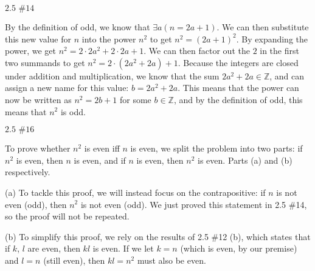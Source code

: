 \documentclass{article}
\newcommand{\problem}[2]{$\boxed{\text{#1 \##2}}$}
\newcommand{\subproblem}[1]{(#1)}
\begin{document}
\begin{multicols*}{2}
%

\problem{2.5}{14}

By the definition of odd, we know that $\exists{}a(n=2a+1)$. We can
then substitute this new value for $n$ into the power $n^2$ to get
$n^2=(2a+1)^2$. By expanding the power, we get
$n^2=2\cdot{}2a^2+2\cdot{}2a+1$. We can then factor out the $2$ in the
first two summands to get $n^2=2\cdot{}(2a^2+2a)+1$. Because the
integers are closed under addition and multiplication, we know that
the sum $2a^2+2a\in\mathbb{Z}$, and can assign a new name for this
value: $b=2a^2+2a$. This means that the power can now be written as
$n^2=2b+1$ for some $b\in\mathbb{Z}$, and by the definition of odd,
this means that $n^2$ is odd.

%

\problem{2.5}{16}

To prove whether $n^2$ is even iff $n$ is even, we split the problem
into two parts: if $n^2$ is even, then $n$ is even, and if $n$ is
even, then $n^2$ is even. Parts (a) and (b) respectively.

\subproblem{a} To tackle this proof, we will instead focus on the
contrapositive: if $n$ is not even (odd), then $n^2$ is not even
(odd). We just proved this statement in 2.5 \#14, so the proof will not
be repeated.

\subproblem{b} To simplify this proof, we rely on the results of 2.5
\#12 (b), which states that if $k$, $l$ are even, then $kl$ is even. If
we let $k=n$ (which is even, by our premise) and $l=n$ (still even),
then $kl=n^2$ must also be even.

\end{multicols*}
\end{document}
